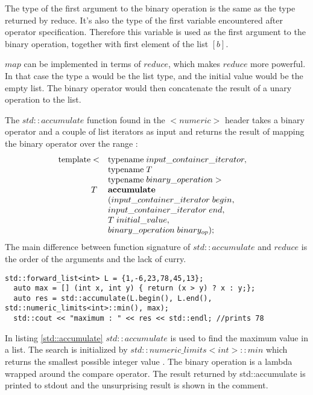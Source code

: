 \documentclass[12pt,fleqn]{article}
\begin{document}
The type of the first argument to the binary operation is the same as the type returned by reduce. 
It's also the type of the first variable encountered after operator specification.
Therefore this variable is used as the first argument to the binary operation, together with first element of the list $[b]$.

$map$ can be implemented in terms of $reduce$, which makes $reduce$ more powerful.
In that case the type a would be the list type, and the initial value would be the empty list.
The binary operator would then concatenate the result of a unary operation to the list.

The $std::accumulate$ function found in the $<numeric>$ header takes a binary operator and a couple of list iterators as input and returns the result of mapping the binary operator over the range \cite{josuttis,std::accumulate}:
\[
\begin{array}{rll}
\mbox{template}<&\mbox{typename}\; input\_container\_iterator, \\
               &\mbox{typename}  \; T \\
             &\mbox{typename} \; binary\_operation >&\\
T \;& \mbox{\bf accumulate}\\
&( input\_container\_iterator\; begin, \\
& input\_container\_iterator\; end, \\
& T \; initial\_value, \\
& binary\_operation \; binary_{op} );
\end{array}
\]
%
The main difference between function signature of $std::accumulate$ and $reduce$ is the order of the arguments and the lack of curry.
\begin{lstlisting}[caption=example of std::accumulate,label=std::accumulate]
std::forward_list<int> L = {1,-6,23,78,45,13};
  auto max = [] (int x, int y) { return (x > y) ? x : y;};
  auto res = std::accumulate(L.begin(), L.end(), std::numeric_limits<int>::min(), max);
  std::cout << "maximum : " << res << std::endl; //prints 78
\end{lstlisting}
In listing \ref{std::accumulate} $std::accumulate$ is used to find the maximum value in a list.
The search is initialized by $std::numeric\_limits<int>::min$ which returns the smallest possible integer value \cite{josuttis}.
The binary operation is a lambda wrapped around the compare operator.
The result returned by std::accumulate is printed to stdout and the unsurprising result is shown in the comment.
\end{document}
